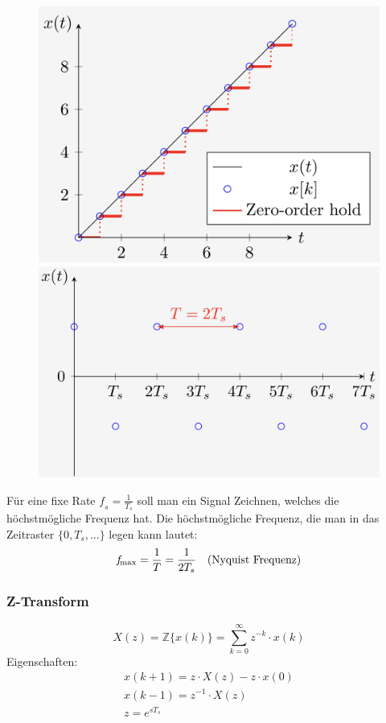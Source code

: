     \begin{figure}[H]
        \centering
        \includegraphics[width = 0.45\linewidth]{images/04/0order_hold.jpeg}
        \includegraphics[width = 0.45\linewidth]{images/04/freq_disctime.jpeg}
    \end{figure}
    
    Für eine fixe Rate $\mathit{f}_s = \frac{1}{T_s}$ soll man ein Signal Zeichnen, welches die höchstmögliche Frequenz hat. Die höchstmögliche Frequenz, die man in das Zeitraster $\{0,T_s,\dots\}$ legen kann lautet:
    \begin{equation*}
        \mathit{f}_\textnormal{max} = \frac{1}{T} = \frac{1}{2T_s} \quad \textnormal{(Nyquist Frequenz)}
    \end{equation*}
    
    \subsubsection{Z-Transform}
        \begin{equation*}
            X(z) = \mathbb{Z}\{x(k)\} = \sum_{k=0}^\infty z^{-k}\cdot x(k)
        \end{equation*}
        Eigenschaften:
        \begin{gather*}
            x(k+1) = z\cdot X(z) - z\cdot x(0)\\
            x(k-1) = z^{-1}\cdot X(z)\\
            z = e^{sT_s}
        \end{gather*}
    
